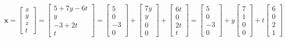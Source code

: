 \documentclass{report}
\begin{document}
\begin{equation}
\mathbf{x}
=
\begin{bmatrix}
x \\ 
y \\ 
z \\
t
\end{bmatrix}
=
\begin{bmatrix}
5+7y-6t \\ 
y \\ 
-3+2t \\
t
\end{bmatrix}
=
\begin{bmatrix}
5 \\ 
0 \\ 
-3 \\
0
\end{bmatrix}
+
\begin{bmatrix}
7y \\ 
y \\ 
0 \\
0
\end{bmatrix}
+
\begin{bmatrix}
6t \\ 
0 \\ 
2t \\
t
\end{bmatrix}
=
\begin{bmatrix}
5 \\ 
0 \\ 
-3 \\
0
\end{bmatrix}
+
y
\begin{bmatrix}
7 \\ 
1 \\ 
0 \\
0
\end{bmatrix}
+
t
\begin{bmatrix}
6 \\ 
0 \\ 
2 \\
1
\end{bmatrix}
\end{equation}

\clearpage
\end{document}
